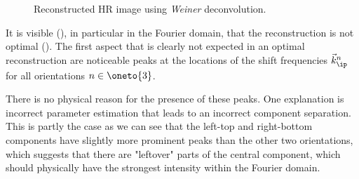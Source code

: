 %
\begin{figure}
    \caption{Reconstructed \ac{HR} image using \emph{Weiner} deconvolution.}
\end{figure}
%

It is visible (), in particular in the Fourier domain, that the
reconstruction is not optimal (). 
The first aspect that is clearly not expected in an optimal reconstruction are noticeable peaks at the locations of the
    shift frequencies \(\vec{k}_\ip^n\) for all orientations \(n \in \oneto{3}\).
\begin{marginfigure}[*-24]
    \caption{
    At the top the full reconstructed image without any modifications and filtering.
    There are visible periodic artefacts, in the \ac{SIM} terminology aptly named \emph{honey comb} artefacts, that are 
        most prominent in the background area of the image. 
    In the middle, the same reconstruction but after performing strong apodization filtering. 
    It is apparent that the apodized image has less artefacts in the background but is also noteworthy, that the image 
        also has a lower resolution that can be observed by comparing the sizes of the beads in the filtered and 
        non-filtered reconstructions. 
    At the bottom, difference between the two reconstructions that accents the form of \emph{honey comb} artefacts.
}
\end{marginfigure}

There is no physical reason for the presence of these peaks.
One explanation is incorrect parameter estimation that leads to an incorrect component separation.
This is partly the case as we can see that the left-top and right-bottom components have slightly more prominent peaks
    than the other two orientations, which suggests that there are "leftover" parts of the central component, which
    should physically have the strongest intensity within the Fourier domain.


